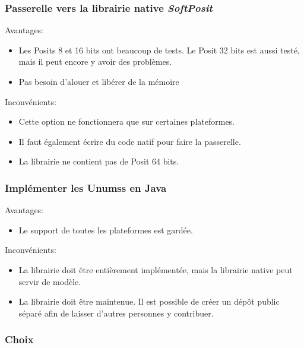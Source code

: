 \subsubsection{Passerelle vers la librairie native \textit{SoftPosit}}

Avantages:
\begin{itemize}
    \item Les \glspl{Posit} 8 et 16 bits ont beaucoup de tests. Le \gls{Posit} 32 bits est aussi testé, mais il peut encore y avoir des problèmes.
    \item Pas besoin d'alouer et libérer de la mémoire
\end{itemize}

Inconvénients:
\begin{itemize}
    \item Cette option ne fonctionnera que sur certaines plateformes.
    \item Il faut également écrire du code natif pour faire la passerelle.
    \item La librairie ne contient pas de \gls{Posit} 64 bits.
\end{itemize}

\subsubsection{Implémenter les \glspl{Unums} en Java}

Avantages:
\begin{itemize}
    \item Le support de toutes les plateformes est gardée.
\end{itemize}

Inconvénients:
\begin{itemize}
    \item La librairie doit être entièrement implémentée, mais la librairie native peut servir de modèle.
    \item La librairie doit être maintenue. Il est possible de créer un dépôt public séparé afin de laisser d'autres personnes y contribuer.
\end{itemize}

\subsubsection{Choix}

